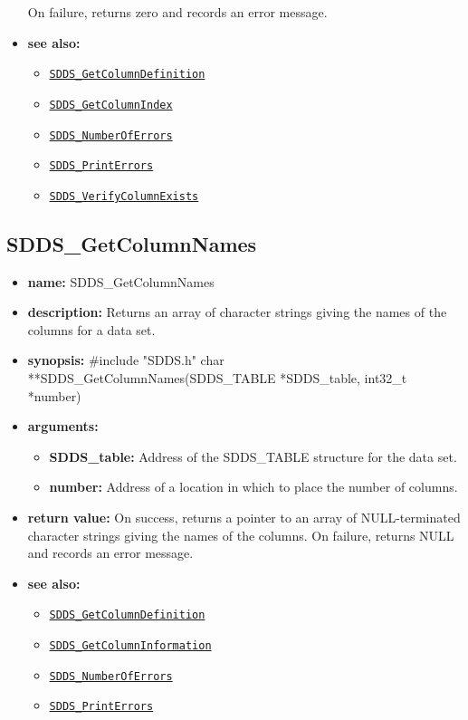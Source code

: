\documentclass[11pt]{article}
\newcommand{\progref}[1]{\hyperref[SDDS_#1]{\tt SDDS\_#1}}
\begin{document}
\begin{itemize}
\newline
On failure, returns zero and records an error message. 
\item {\bf see also:}
\begin{itemize}
\item \progref{GetColumnDefinition}
\item \progref{GetColumnIndex}
\item \progref{NumberOfErrors}
\item \progref{PrintErrors}
\item \progref{VerifyColumnExists}
\end{itemize}
\end{itemize}

\subsection{SDDS\_GetColumnNames}
\label{SDDS_GetColumnNames}

\begin{itemize}
\item {\bf name:}\newline
SDDS\_GetColumnNames
\item {\bf description:}\newline
Returns an array of character strings giving the names of the columns for a data set.
\item {\bf synopsis:} \#include "SDDS.h"\newline
char **SDDS\_GetColumnNames(SDDS\_TABLE *SDDS\_table, int32\_t *number)
\item {\bf arguments:}
\begin{itemize}
\item {\bf SDDS\_table:} Address of the SDDS\_TABLE structure for the data set.
\item {\bf number:} Address of a location in which to place the number of columns.
\end{itemize}
\item {\bf return value:}\newline
On success, returns a pointer to an array of NULL-terminated character strings giving the names of the columns. On failure, returns NULL and records an error message.
\item {\bf see also:}
\begin{itemize}
\item \progref{GetColumnDefinition}
\item \progref{GetColumnInformation}
\item \progref{NumberOfErrors}
\item \progref{PrintErrors}
\end{itemize}
\end{itemize}
\end{document}
